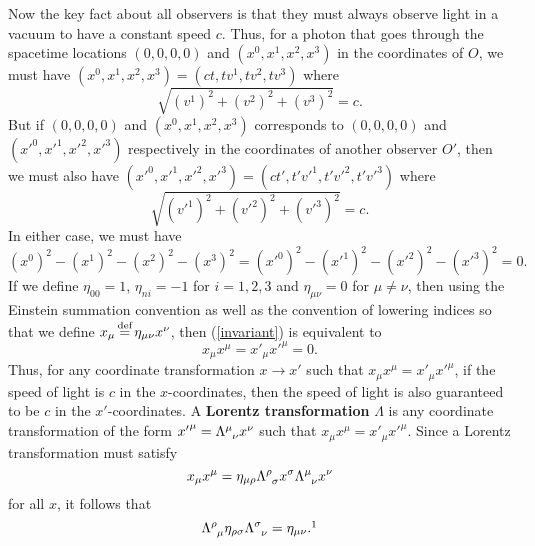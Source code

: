 Now the key fact about all observers is that they must always observe light in a vacuum to have a constant speed $c$. Thus,  for a photon that goes through the spacetime locations $(0,0,0,0)$ and $(x^0, x^1, x^2, x^3)$ in the coordinates of $O$, we must have $(x^0, x^1, x^2, x^3)=(ct,tv^1,tv^2,tv^3)$ where 
$$\sqrt{(v^1)^2 +(v^2)^2+(v^3)^2}=c.$$ But if $(0,0,0,0)$ and $(x^0, x^1, x^2, x^3)$ corresponds to $(0,0,0,0)$ and $({x'}^0, {x'}^1, {x'}^2, {x'}^3)$ respectively in the coordinates of another observer $O'$, then we must also have $({x'}^0, {x'}^1, {x'}^2, {x'}^3)=(ct',t'{v'}^1,t'{v'}^2,t'{v'}^3)$ where 
$$\sqrt{({v'}^1)^2 +({v'}^2)^2+({v'}^3)^2}=c.$$ 
In either case, we must have 
\begin{equation}\label{invariant}
(x^0)^2- (x^1)^2- (x^2)^2 - (x^3)^2=({x'}^0)^2- ({x'}^1)^2- ({x'}^2)^2 - ({x'}^3)^2=0.
\end{equation}
If we define $\eta_{00}=1$, $\eta_{ni}=-1$ for $i=1,2,3$ and $\eta_{\mu\nu}=0$ for $\mu\neq\nu$, then using the Einstein summation convention as well as the convention of lowering indices so that we define $x_\mu\myeq\eta_{\mu\nu}x^\nu$, then (\ref{invariant}) is equivalent to 
$$x_\mu x^\mu={x'}_\mu {x'}^\mu=0.$$ 
Thus, for any coordinate transformation $x\rightarrow x'$ such that  $x_\mu x^\mu={x'}_\mu{x'}^\mu$,  if the speed of light is $c$ in the $x$-coordinates, then the speed of light is also guaranteed to be $c$ in the $x'$-coordinates.  A \textbf{Lorentz transformation} $\Lambda$ is any coordinate transformation of the form ${x'}^\mu=\Lambda\indices{^\mu_\nu}x^\nu$ such that $x_\mu x^\mu={x'}_\mu{x'}^\mu$. Since a Lorentz transformation must satisfy
$$x_\mu x^\mu=\eta_{\mu\rho}\Lambda\indices{^\rho_\sigma}x^\sigma\Lambda\indices{^\mu_\nu}x^\nu$$
for all $x$, it follows that  
\begin{equation}\label{lorentztrans}
\Lambda\indices{^\rho_\mu}\eta_{\rho\sigma}\Lambda\indices{^\sigma_\nu}=\eta_{\mu\nu}.\protect\footnotemark
\end{equation}
